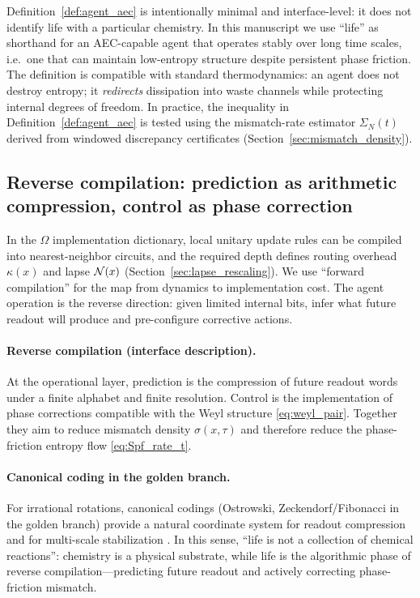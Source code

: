 \begin{remark}
Definition~\ref{def:agent_aec} is intentionally minimal and interface-level: it does not identify life with a particular chemistry.
In this manuscript we use ``life'' as shorthand for an AEC-capable agent that operates stably over long time scales, i.e.\ one that can maintain low-entropy structure despite persistent phase friction.
The definition is compatible with standard thermodynamics: an agent does not destroy entropy; it \emph{redirects} dissipation into waste channels while protecting internal degrees of freedom.
In practice, the inequality in Definition~\ref{def:agent_aec} is tested using the mismatch-rate estimator $\Sigma_N(t)$ derived from windowed discrepancy certificates (Section~\ref{sec:mismatch_density}).
\end{remark}

\subsection{Reverse compilation: prediction as arithmetic compression, control as phase correction}
\label{sec:reverse_compilation}

In the $\Omega$ implementation dictionary, local unitary update rules can be compiled into nearest-neighbor circuits, and the required depth defines routing overhead $\kappa(x)$ and lapse $\mathcal{N}(x)$ (Section~\ref{sec:lapse_rescaling}).
We use ``forward compilation'' for the map from dynamics to implementation cost.
The agent operation is the reverse direction: given limited internal bits, infer what future readout will produce and pre-configure corrective actions.

\paragraph{Reverse compilation (interface description).}
At the operational layer, prediction is the compression of future readout words under a finite alphabet and finite resolution.
Control is the implementation of phase corrections compatible with the Weyl structure \eqref{eq:weyl_pair}.
Together they aim to reduce mismatch density $\sigma(x,\tau)$ and therefore reduce the phase-friction entropy flow \eqref{eq:Spf_rate_t}.

\paragraph{Canonical coding in the golden branch.}
For irrational rotations, canonical codings (Ostrowski, Zeckendorf/Fibonacci in the golden branch) provide a natural coordinate system for readout compression and for multi-scale stabilization \cite{Zeckendorf1972,Ma2025HPA,Ma2025CT,Ma2025HPT}.
In this sense, ``life is not a collection of chemical reactions'': chemistry is a physical substrate, while life is the algorithmic phase of reverse compilation---predicting future readout and actively correcting phase-friction mismatch.



